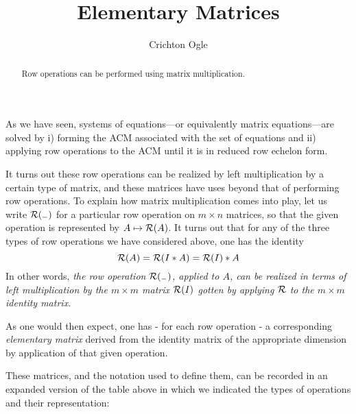 \documentclass{ximera}
\title{Elementary Matrices}
\author{Crichton Ogle}
\begin{document}
\begin{abstract}
  Row operations can be performed using matrix multiplication.
\end{abstract}
\maketitle

As we have seen, systems of equations---or equivalently matrix
equations---are solved by i) forming the ACM associated with the set
of equations and ii) applying row operations to the ACM until it is in
reduced row echelon form.

It turns out these row operations can be realized by left
multiplication by a certain type of matrix, and these matrices have
uses beyond that of performing row operations. To explain how matrix
multiplication comes into play, let us write $\cal R(_-)$ for a
particular row operation on $m\times n$ matrices, so that the given
operation is represented by $A\mapsto {\cal R}(A)$. It turns out that
for any of the three types of row operations we have considered above,
one has the identity
\[
{\cal R}(A) = {\cal R}(I*A) = {\cal R}(I)*A
\]
In other words, {\it the row operation ${\cal R}(_-)$, applied to $A$, can be realized in terms of left multiplication by the $m\times m$ matrix ${\cal R}(I)$ gotten by applying $\cal R$ to the $m\times m$ identity matrix}.

As one would then expect, one has - for each row operation - a
corresponding {\it elementary matrix} derived from the identity matrix
of the appropriate dimension by application of that given operation.

These matrices, and the notation used to define them, can be recorded
in an expanded version of the table above in which we indicated the
types of operations and their representation:
\end{document}
